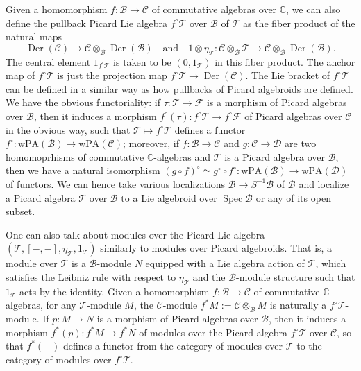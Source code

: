 \documentclass[12pt]{amsart}
\newcommand{\C}{\mathbb{C}}
\newcommand{\B}{\mathcal{B}}
\newcommand{\T}{\mathcal{T}}
\newcommand{\F}{\mathcal{F}}
\newcommand{\spec}{\operatorname{Spec}}
\newcommand{\Dcal}{\mathcal{D}}
\newcommand{\der}{{\operatorname{Der}}}
\theoremstyle{definition}
\numberwithin{equation}{section}
\begin{document}
Given a homomorphism $f: \B \to \mathcal{C}$ of commutative algebras over $\C$, we can also define the pullback Picard Lie algebra $f^\circ \T$ over $\mathcal{B}$ of $\T$ as the fiber product of the natural maps
  \[  \der(\mathcal{C}) \to \mathcal{C} \otimes_{\B} \der(\B) \quad \text{and} \quad 1 \otimes \eta_\T :  \mathcal{C} \otimes_{\B} \T \to \mathcal{C} \otimes_{\B} \der(\B).\]
The central element $1_{f^\circ \T}$ is taken to be $(0, 1_\T)$ in this fiber product. The anchor map of $f^\circ \T$ is just the projection map $f^\circ \T \to \der(\mathcal{C})$. The Lie bracket of $f^\circ \T$ can be defined in a similar way as how pullbacks of Picard algebroids are defined. We have the obvious functoriality: if $\tau: \T \to \F$ is a morphism of Picard algebras over $\B$, then it induces a morphism $f^\circ(\tau): f^\circ \T \to f^\circ \F$ of Picard algebras over $\mathcal{C}$ in the obvious way, such that  $\T \mapsto f^\circ \T$ defines a functor $f^\circ: \mathrm{wPA}(\B) \to \mathrm{wPA}(\mathcal{C})$; moreover,
 if $f: \B \to \mathcal{C}$ and $g: \mathcal{C} \to \Dcal$ are two homomoprhisms of commutative $\C$-algebras and $\T$ is a Picard algebra over $\B$, then we have a natural isomorphism $(g \circ f)^\circ  \simeq g^\circ \circ f^\circ : \mathrm{wPA}(\B) \to \mathrm{wPA}(\mathcal{\Dcal})$ of functors. We can hence take various localizations $\B \to S^{-1} \B$ of $\B$ and localize a Picard algebra $\T$ over $\B$ to a Lie algebroid over $\spec \B$ or any of its open subset.

One can also talk about modules over the Picard Lie algebra $(\T, [-,-], \eta_\T, 1_\T)$ similarly to modules over Picard algebroids. That is, a module over $\T$ is a $\B$-module $N$  equipped with a Lie algebra action of $\T$, which satisfies the Leibniz rule with respect to $\eta_\T$ and the $\B$-module structure such that $1_\T$ acts by the identity. Given a homomorphism $f: \B \to \mathcal{C}$ of commutative $\C$-algebras, for any $\T$-module $M$, the $\mathcal{C}$-module $f^*M := \mathcal{C} \otimes_{\B}  M$ is naturally a $f^\circ \T$-module. If $p: M \to N$ is a morphism of Picard algebras over $\B$, then it induces a morphism $f^*(p) : f^*M \to f^*N$ of modules over the Picard algebra $f^\circ \T$ over $\mathcal{C}$, so that $f^*(-)$ defines a functor from the category of modules over $\T$ to the category of modules over $f^\circ \T$.
\end{document}
